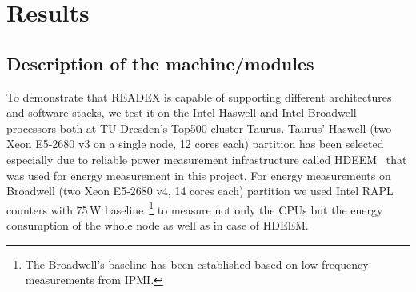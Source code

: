 \section{Results} \label{sec:results}
\subsection{Description of the machine/modules}
To demonstrate that READEX is capable of supporting different architectures and software stacks, we test it on the Intel Haswell and Intel Broadwell processors both at TU Dresden's Top500 cluster Taurus. Taurus' Haswell (two Xeon E5-2680 v3 on a single node, 12 cores each) partition has been selected especially due to reliable power measurement infrastructure called HDEEM~\cite{hdeem} that was used for energy measurement in this project. For energy measurements on Broadwell (two Xeon E5-2680 v4, 14 cores each) partition we used Intel RAPL counters with 75\,W baseline~\footnote{The Broadwell's baseline has been established based on low frequency measurements from IPMI.} to measure not only the CPUs but the energy consumption of the whole node as well as in case of HDEEM.

